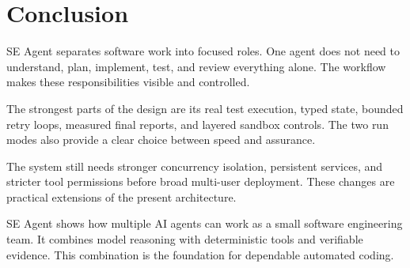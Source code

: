 \documentclass[11pt,a4paper]{article}
\begin{document}
\section{Conclusion}

SE Agent separates software work into focused roles. One agent does not need to
understand, plan, implement, test, and review everything alone. The workflow
makes these responsibilities visible and controlled.

The strongest parts of the design are its real test execution, typed state,
bounded retry loops, measured final reports, and layered sandbox controls. The
two run modes also provide a clear choice between speed and assurance.

The system still needs stronger concurrency isolation, persistent services, and
stricter tool permissions before broad multi-user deployment. These changes are
practical extensions of the present architecture.

SE Agent shows how multiple AI agents can work as a small software engineering
team. It combines model reasoning with deterministic tools and verifiable
evidence. This combination is the foundation for dependable automated coding.
\end{document}

